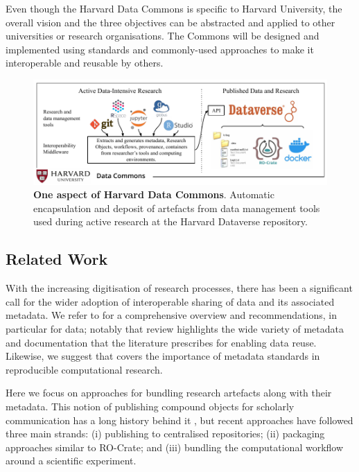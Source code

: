 Even though the Harvard Data Commons is specific to Harvard University,
the overall vision and the three objectives can be abstracted and
applied to other universities or research organisations. The Commons
will be designed and implemented using standards and commonly-used
approaches to make it interoperable and reusable by others.

\begin{figure}%
  \includegraphics[width=1.1\textwidth]{figures/ch05/data-commons-ro-crate-figure-5.pdf}
	\caption[Harvard Data Commons]{\textbf{One aspect of Harvard Data Commons}. Automatic
  encapsulation and deposit of artefacts from data management tools used
  during active research at the Harvard Dataverse repository.}
  \label{ch5:fig:hdc}
\end{figure}

\subsection{Related Work}\label{ch5:relatedwork}

With the increasing digitisation of research processes, there has been a
significant call for the wider adoption of interoperable sharing of data
and its associated metadata. We refer to
\cite{ch5-72} for a
comprehensive overview and recommendations, in particular for data;
notably that review highlights the wide variety of metadata and
documentation that the literature prescribes for enabling data reuse.
Likewise, we suggest
\cite{Leipzig 2021} that
covers the importance of metadata standards in reproducible
computational research.

Here we focus on approaches for bundling research artefacts along with
their metadata. This notion of publishing compound objects for scholarly
communication has a long history behind it
\cite{Claerbout 1992,ch5-117},
but recent approaches have followed three main strands: (i) publishing to
centralised repositories; (ii) packaging approaches similar to RO-Crate;
and (iii) bundling the computational workflow around a scientific
experiment.

